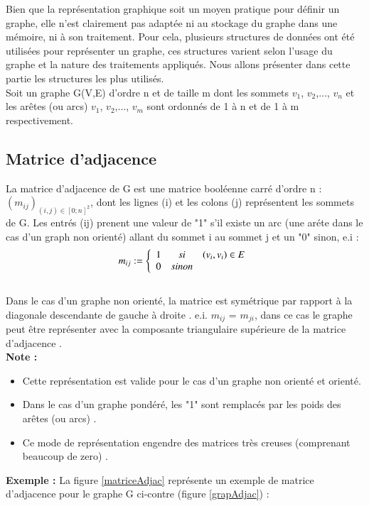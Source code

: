 Bien que la représentation graphique soit un moyen pratique pour définir un graphe, elle n'est clairement pas adaptée ni au stockage du graphe dans une mémoire, ni à son traitement. Pour cela, plusieurs structures de données ont été utilisées pour représenter un graphe, ces structures varient selon l’usage du graphe et la nature des traitements appliqués. Nous allons présenter dans cette partie les structures les plus utilisés.
\\Soit un graphe G(V,E) d’ordre n et de taille m dont les sommets $\textit{v}_{1}$, $\textit{v}_{2}$,..., $\textit{v}_{n}$ et les arêtes (ou arcs) $\textit{v}_{1}$, $\textit{v}_{2}$,..., $\textit{v}_{m}$ sont ordonnés de 1 à n et de 1 à m respectivement.
		
		

		
			\subsection{Matrice d'adjacence}
			
				La matrice d’adjacence de G est une matrice booléenne 					carré d’ordre n : ${({m}_{ij})}_{(i,j) \in {[0;n]}^{2}}$,  dont les 					lignes (i) et les colons (j)  représentent les sommets de G. Les entrés (ij) prenent une valeur de "1" s’il existe un 				arc (une aréte dans le cas d'un graph non orienté) allant du 			sommet i au sommet j et un "0" sinon, e.i \citep{lehman2010mathematics} \citep{mathieu} \citep{IUTLyonInformatique} :
			\[{m}_{ij} :=
			\left\{
			\begin{array}{r c l}
			1 & si & (\textit{v}_{i} , \textit{v}_{i}) \in E \\
			0 & sinon
			\end{array}
			\right.
			\]
			\\
			Dans le cas d’un graphe non orienté, la matrice est 						symétrique par rapport à la diagonale descendante de gauche	 			à droite . e.i. ${m}_{ij}$ = ${m}_{ji}$, dans ce cas le 						graphe peut être représenter avec  la composante 							triangulaire supérieure de la matrice d'adjacence \citep{muller}.\\
			\textbf{Note :} \begin{itemize} 
			\item Cette représentation est valide pour le cas 					d'un graphe non orienté et orienté.
			\item Dans le cas d'un graphe pondéré, les "1" sont remplacés par les poids des arêtes (ou arcs) \citep{lopez2003cours}.
			\item Ce mode de représentation engendre des matrices très creuses (comprenant beaucoup de zero) \citep{hennecart2012elements}. 
			\end{itemize}
			\textbf{Exemple :} La figure \ref{matriceAdjac} représente 					un exemple de matrice d'adjacence pour le graphe G ci-contre 			(figure \ref{grapAdjac}) :
			
